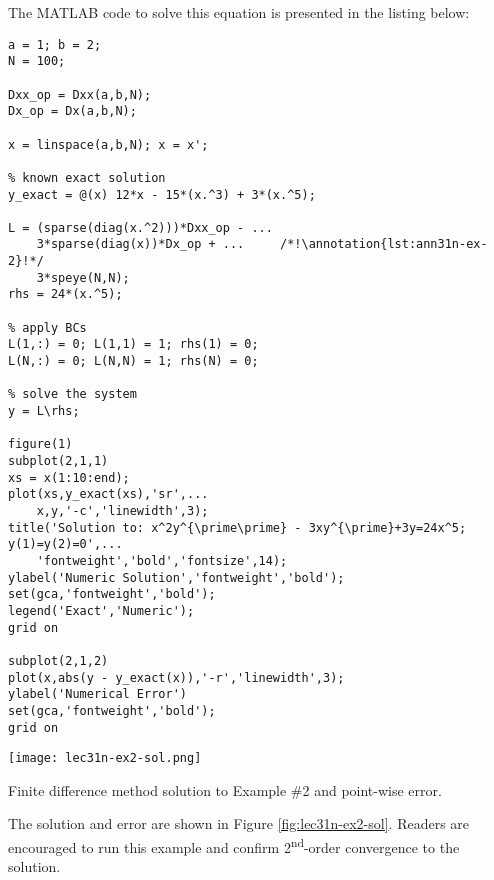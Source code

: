 The MATLAB code to solve this equation is presented in the listing below:
\begin{lstlisting}[style=myMatlab,name=lec31n-ex2]
a = 1; b = 2;
N = 100;

Dxx_op = Dxx(a,b,N);
Dx_op = Dx(a,b,N);

x = linspace(a,b,N); x = x';

% known exact solution
y_exact = @(x) 12*x - 15*(x.^3) + 3*(x.^5);

L = (sparse(diag(x.^2)))*Dxx_op - ...
    3*sparse(diag(x))*Dx_op + ...     /*!\annotation{lst:ann31n-ex-2}!*/
    3*speye(N,N);
rhs = 24*(x.^5);

% apply BCs
L(1,:) = 0; L(1,1) = 1; rhs(1) = 0;
L(N,:) = 0; L(N,N) = 1; rhs(N) = 0;

% solve the system
y = L\rhs;

figure(1)
subplot(2,1,1)
xs = x(1:10:end);
plot(xs,y_exact(xs),'sr',...
    x,y,'-c','linewidth',3);
title('Solution to: x^2y^{\prime\prime} - 3xy^{\prime}+3y=24x^5;  y(1)=y(2)=0',...
    'fontweight','bold','fontsize',14);
ylabel('Numeric Solution','fontweight','bold');
set(gca,'fontweight','bold');
legend('Exact','Numeric');
grid on

subplot(2,1,2)
plot(x,abs(y - y_exact(x)),'-r','linewidth',3);
ylabel('Numerical Error')
set(gca,'fontweight','bold');
grid on
\end{lstlisting}
\begin{marginfigure}[-4.0cm]
\texttt{[image: lec31n-ex2-sol.png]}
\caption{Finite difference method solution to Example \#2 and point-wise error.}
\label{fig:lec31n-ex2-sol}
\end{marginfigure}
The solution and error are shown in Figure \ref{fig:lec31n-ex2-sol}.  Readers are encouraged to run this example and confirm 2\textsuperscript{nd}-order convergence to the solution.

